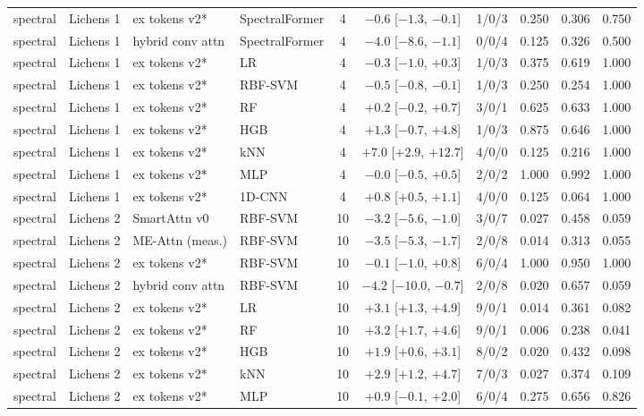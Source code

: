 \begin{tabular}{llllcclccc}
spectral & Lichens 1 & ex tokens v2* & SpectralFormer & 4 & $-0.6$ [$-1.3$, $-0.1$] & 1/0/3 & 0.250 & 0.306 & 0.750 \\
spectral & Lichens 1 & hybrid conv attn & SpectralFormer & 4 & $-4.0$ [$-8.6$, $-1.1$] & 0/0/4 & 0.125 & 0.326 & 0.500 \\
spectral & Lichens 1 & ex tokens v2* & LR & 4 & $-0.3$ [$-1.0$, $+0.3$] & 1/0/3 & 0.375 & 0.619 & 1.000 \\
spectral & Lichens 1 & ex tokens v2* & RBF-SVM & 4 & $-0.5$ [$-0.8$, $-0.1$] & 1/0/3 & 0.250 & 0.254 & 1.000 \\
spectral & Lichens 1 & ex tokens v2* & RF & 4 & $+0.2$ [$-0.2$, $+0.7$] & 3/0/1 & 0.625 & 0.633 & 1.000 \\
spectral & Lichens 1 & ex tokens v2* & HGB & 4 & $+1.3$ [$-0.7$, $+4.8$] & 1/0/3 & 0.875 & 0.646 & 1.000 \\
spectral & Lichens 1 & ex tokens v2* & kNN & 4 & $+7.0$ [$+2.9$, $+12.7$] & 4/0/0 & 0.125 & 0.216 & 1.000 \\
spectral & Lichens 1 & ex tokens v2* & MLP & 4 & $-0.0$ [$-0.5$, $+0.5$] & 2/0/2 & 1.000 & 0.992 & 1.000 \\
spectral & Lichens 1 & ex tokens v2* & 1D-CNN & 4 & $+0.8$ [$+0.5$, $+1.1$] & 4/0/0 & 0.125 & 0.064 & 1.000 \\
\midrule
spectral & Lichens 2 & SmartAttn v0 & RBF-SVM & 10 & $-3.2$ [$-5.6$, $-1.0$] & 3/0/7 & 0.027 & 0.458 & 0.059 \\
spectral & Lichens 2 & ME-Attn (meas.) & RBF-SVM & 10 & $-3.5$ [$-5.3$, $-1.7$] & 2/0/8 & 0.014 & 0.313 & 0.055 \\
spectral & Lichens 2 & ex tokens v2* & RBF-SVM & 10 & $-0.1$ [$-1.0$, $+0.8$] & 6/0/4 & 1.000 & 0.950 & 1.000 \\
spectral & Lichens 2 & hybrid conv attn & RBF-SVM & 10 & $-4.2$ [$-10.0$, $-0.7$] & 2/0/8 & 0.020 & 0.657 & 0.059 \\
spectral & Lichens 2 & ex tokens v2* & LR & 10 & $+3.1$ [$+1.3$, $+4.9$] & 9/0/1 & 0.014 & 0.361 & 0.082 \\
spectral & Lichens 2 & ex tokens v2* & RF & 10 & $+3.2$ [$+1.7$, $+4.6$] & 9/0/1 & 0.006 & 0.238 & 0.041 \\
spectral & Lichens 2 & ex tokens v2* & HGB & 10 & $+1.9$ [$+0.6$, $+3.1$] & 8/0/2 & 0.020 & 0.432 & 0.098 \\
spectral & Lichens 2 & ex tokens v2* & kNN & 10 & $+2.9$ [$+1.2$, $+4.7$] & 7/0/3 & 0.027 & 0.374 & 0.109 \\
spectral & Lichens 2 & ex tokens v2* & MLP & 10 & $+0.9$ [$-0.1$, $+2.0$] & 6/0/4 & 0.275 & 0.656 & 0.826 \\

\end{tabular}
